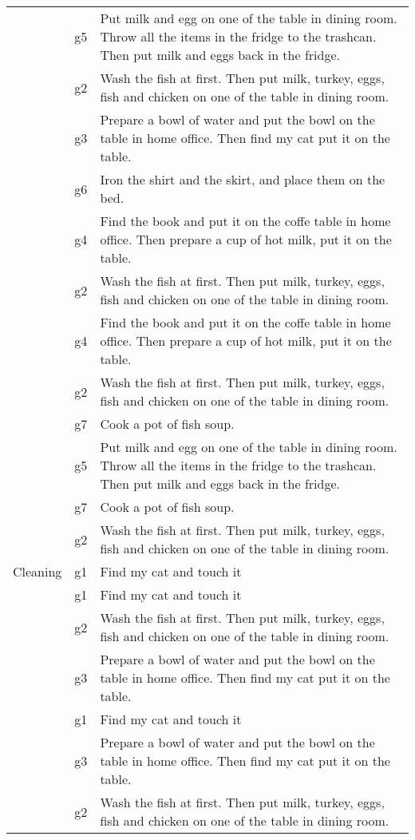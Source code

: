 \begin{table}[htbp]
\begin{tabular}{l|l|l}
 & g5 & Put milk and egg on one of the table in dining room. Throw all the items in the fridge to the trashcan. Then put milk and eggs back in the fridge. \\
 & g2 & Wash the fish at first. Then put milk, turkey, eggs, fish and chicken on one of the table in dining room. \\
 & g3 & Prepare a bowl of water and put the bowl on the table in home office. Then find my cat put it on the table. \\
 & g6 & Iron the shirt and the skirt, and place them on the bed. \\
 & g4 & Find the book and put it on the coffe table in home office. Then prepare a cup of hot milk, put it on the table. \\
 & g2 & Wash the fish at first. Then put milk, turkey, eggs, fish and chicken on one of the table in dining room. \\
 & g4 & Find the book and put it on the coffe table in home office. Then prepare a cup of hot milk, put it on the table. \\
 & g2 & Wash the fish at first. Then put milk, turkey, eggs, fish and chicken on one of the table in dining room. \\
 & g7 & Cook a pot of fish soup. \\
 & g5 & Put milk and egg on one of the table in dining room. Throw all the items in the fridge to the trashcan. Then put milk and eggs back in the fridge. \\
 & g7 & Cook a pot of fish soup. \\
 & g2 & Wash the fish at first. Then put milk, turkey, eggs, fish and chicken on one of the table in dining room. \\
Cleaning & g1 & Find my cat and touch it \\
 & g1 & Find my cat and touch it \\
 & g2 & Wash the fish at first. Then put milk, turkey, eggs, fish and chicken on one of the table in dining room. \\
 & g3 & Prepare a bowl of water and put the bowl on the table in home office. Then find my cat put it on the table. \\
 & g1 & Find my cat and touch it \\
 & g3 & Prepare a bowl of water and put the bowl on the table in home office. Then find my cat put it on the table. \\
 & g2 & Wash the fish at first. Then put milk, turkey, eggs, fish and chicken on one of the table in dining room. \\

\end{tabular}
\end{table}
